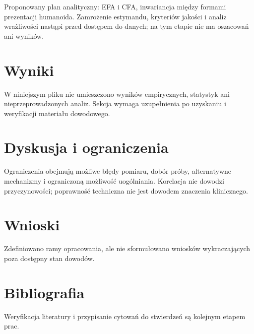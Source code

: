 \documentclass[11pt,a4paper]{article}
\begin{document}
Proponowany plan analityczny: EFA i CFA, inwariancja między formami prezentacji humanoida. Zamrożenie estymandu, kryteriów jakości i analiz wrażliwości nastąpi przed dostępem do danych; na tym etapie nie ma oszacowań ani wyników.

\section{Wyniki}

W niniejszym pliku nie umieszczono wyników empirycznych, statystyk ani nieprzeprowadzonych analiz. Sekcja wymaga uzupełnienia po uzyskaniu i weryfikacji materiału dowodowego.

\section{Dyskusja i ograniczenia}

Ograniczenia obejmują możliwe błędy pomiaru, dobór próby, alternatywne mechanizmy i ograniczoną możliwość uogólniania. Korelacja nie dowodzi przyczynowości; poprawność techniczna nie jest dowodem znaczenia klinicznego.

\section{Wnioski}

Zdefiniowano ramy opracowania, ale nie sformułowano wniosków wykraczających poza dostępny stan dowodów.

\section*{Bibliografia}

Weryfikacja literatury i przypisanie cytowań do stwierdzeń są kolejnym etapem prac.
\end{document}
